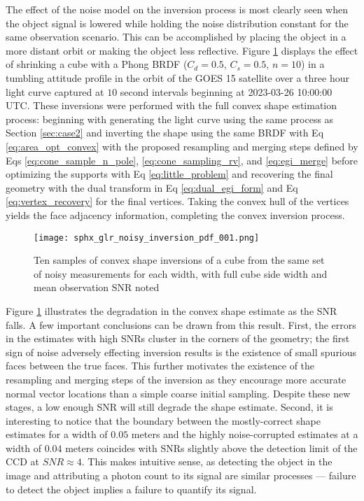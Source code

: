 The effect of the noise model on the inversion process is most clearly seen when the object signal is lowered while holding the noise distribution constant for the same observation scenario. This can be accomplished by placing the object in a more distant orbit or making the object less reflective. Figure \ref{fig:noisy_convex_inversions} displays the effect of shrinking a cube with a Phong BRDF ($C_d=0.5$, $C_s=0.5$, $n=10$) in a tumbling attitude profile in the orbit of the GOES 15 satellite over a three hour light curve captured at $10$ second intervals beginning at 2023-03-26 10:00:00 UTC. These inversions were performed with the full convex shape estimation process: beginning with generating the light curve using the same process as Section \ref{sec:case2} and inverting the shape using the same BRDF with Eq \ref{eq:area_opt_convex} with the proposed resampling and merging steps defined by Eqs \ref{eq:cone_sample_n_pole}, \ref{eq:cone_sampling_rv}, and \ref{eq:egi_merge} before optimizing the supports with Eq \ref{eq:little_problem} and recovering the final geometry with the dual transform in Eq \ref{eq:dual_egi_form} and Eq \ref{eq:vertex_recovery} for the final vertices. Taking the convex hull of the vertices yields the face adjacency information, completing the convex inversion process.

\begin{figure}[!htb]
  \centering
  \texttt{[image: sphx\_glr\_noisy\_inversion\_pdf\_001.png]}
  \caption{Ten samples of convex shape inversions of a cube from the same set of noisy measurements for each width, with full cube side width and mean observation SNR noted}
  \label{fig:noisy_convex_inversions}
\end{figure}

Figure \ref{fig:noisy_convex_inversions} illustrates the degradation in the convex shape estimate as the SNR falls. A few important conclusions can be drawn from this result. First, the errors in the estimates with high SNRs cluster in the corners of the geometry; the first sign of noise adversely effecting inversion results is the existence of small spurious faces between the true faces. This further motivates the existence of the resampling and merging steps of the inversion as they encourage more accurate normal vector locations than a simple coarse initial sampling. Despite these new stages, a low enough SNR will still degrade the shape estimate. Second, it is interesting to notice that the boundary between the mostly-correct shape estimates for a width of $0.05$ meters and the highly noise-corrupted estimates at a width of $0.04$ meters coincides with SNRs slightly above the detection limit of the CCD at $SNR\approx 4$. This makes intuitive sense, as detecting the object in the image and attributing a photon count to its signal are similar processes --- failure to detect the object implies a failure to quantify its signal.

